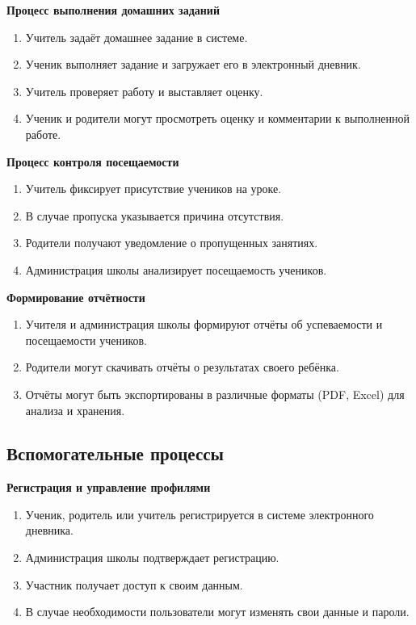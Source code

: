 \documentclass[a4paper, final]{article}
\begin{document}
\noindent \textbf{Процесс выполнения домашних заданий}
\begin{enumerate}
  \item Учитель задаёт домашнее задание в системе.
  \item Ученик выполняет задание и загружает его в электронный дневник.
  \item Учитель проверяет работу и выставляет оценку.
  \item Ученик и родители могут просмотреть оценку и комментарии к выполненной работе.
\end{enumerate}

\noindent \textbf{Процесс контроля посещаемости}
\begin{enumerate}
  \item Учитель фиксирует присутствие учеников на уроке.
  \item В случае пропуска указывается причина отсутствия.
  \item Родители получают уведомление о пропущенных занятиях.
  \item Администрация школы анализирует посещаемость учеников.
\end{enumerate}

\noindent \textbf{Формирование отчётности}
\begin{enumerate}
  \item Учителя и администрация школы формируют отчёты об успеваемости и посещаемости учеников.
  \item Родители могут скачивать отчёты о результатах своего ребёнка.
  \item Отчёты могут быть экспортированы в различные форматы (PDF, Excel) для анализа и хранения.
\end{enumerate}


\subsection{Вспомогательные процессы}
\noindent \textbf{Регистрация и управление профилями}
\begin{enumerate}
  \item Ученик, родитель или учитель регистрируется в системе электронного дневника.
  \item Администрация школы подтверждает регистрацию.
  \item Участник получает доступ к своим данным.
  \item В случае необходимости пользователи могут изменять свои данные и пароли.
\end{enumerate}
\end{document}
